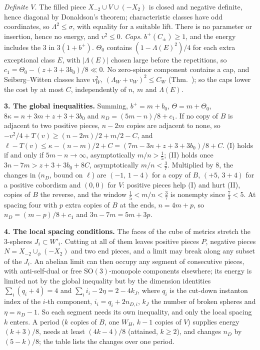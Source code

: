 \documentclass[10pt]{amsart}
\newcommand{\head}[1]{\par\vspace{2pt}\noindent\textbf{#1}\enspace}
\begin{document}
\emph{Definite $V$.} The filled piece $X_{-2}\cup V\cup(-X_2)$ is closed and negative definite, hence diagonal by Donaldson's theorem; characteristic classes have odd coordinates, so $\Lambda^2\le\sigma$, with equality for a suitable lift. There is no parameter or insertion, hence no energy, and $v^2\le0$. \emph{Caps.} $b^+(C_\pm)\ge1$, and the energy includes the $3$ in $3(1+b^+)$. $\Theta_0$ contains $(1-\Lambda(E)^2)/4$ for each extra exceptional class $E$, with $|\Lambda(E)|$ chosen large before the repetitions, so $c_1=\Theta_0-(z+3+3b_0)/8\ll0$. No zero-spinor component contains a cap, and Seiberg--Witten classes have $v_W^2,\,(\Lambda_W+v_W)^2\le C_W$ (Thm.~); so the caps lower the cost by at most $C$, independently of $n$, $m$ and $\Lambda(E)$.

\head{3. The global inequalities.}
Summing, $b^+=m+b_0$, $\Theta=m+\Theta_0$, $8\kappa=n+3m+z+3+3b_0$ and $n_D=(5m-n)/8+c_1$. If no copy of $B$ is adjacent to two positive pieces, $n-2m$ copies are adjacent to none, so $-v^2/4+T(v)\ge(n-2m)/2+m/2-C$, and $\ell-T(v)\le\kappa-(n-m)/2+C=(7m-3n+z+3+3b_0)/8+C$. (I) holds if and only if $5m-n\to\infty$, asymptotically $m/n>\frac15$; (II) holds once $3n-7m>z+3+3b_0+8C$, asymptotically $m/n<\frac37$. Multiplied by $8$, the changes in ($n_D$, bound on $\ell$) are $(-1,\,1-4)$ for a copy of $B$, $(+5,\,3+4)$ for a positive cobordism and $(0,0)$ for $V$: positive pieces help (I) and hurt (II), copies of $B$ the reverse, and the window $\frac15<m/n<\frac37$ is nonempty since $\frac73<5$. At spacing four with $p$ extra copies of $B$ at the ends, $n=4m+p$, so $n_D=(m-p)/8+c_1$ and $3n-7m=5m+3p$.

\head{4. The local spacing conditions.}
The faces of the cube of metrics stretch the $3$-spheres $J_i\subset W'_i$. Cutting at all of them leaves positive pieces $P$, negative pieces $N=X_{-2}\cup_\phi(-X_2)$ and two end pieces, and a limit may break along any subset of the $J_i$. An abelian limit can then occupy any segment of consecutive pieces, with anti-self-dual or free $\mathrm{SO}(3)$-monopole components elsewhere; its energy is limited not by the global inequality but by the dimension identities $\sum_i(q_i+4)=4$ and $\sum_ii_i-2\eta=2-4k_J$, where $q_i$ is the cut-down instanton index of the $i$-th component, $i_i=q_i+2n_{D,i}$, $k_J$ the number of broken spheres and $\eta=n_D-1$. So each segment needs its own inequality, and only the local spacing $k$ enters. A period ($k$ copies of $B$, one $W_H$, $k-1$ copies of $V$) supplies energy $(k+3)/8$, needs at least $(4k-4)/8$ (attained, $k\ge2$), and changes $n_D$ by $(5-k)/8$; the table lists the changes over one period.
\end{document}
